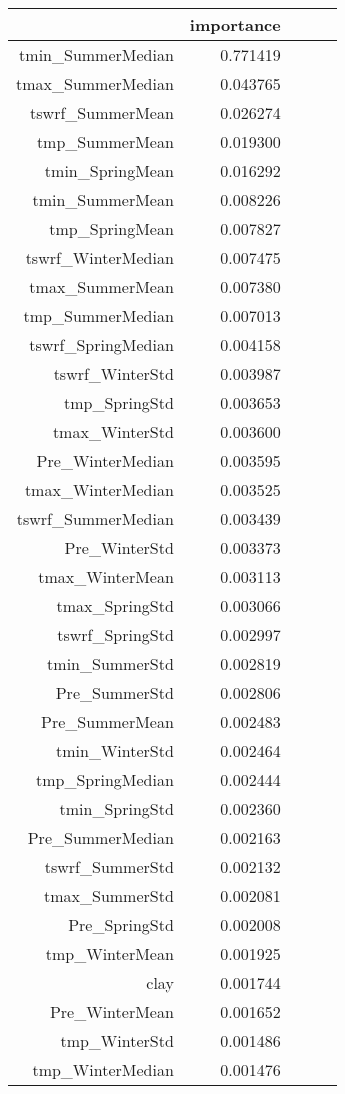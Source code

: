 \begin{tabular}{rrrrr}
\toprule
 & importance \\
\midrule
tmin_SummerMedian & 0.771419 \\
tmax_SummerMedian & 0.043765 \\
tswrf_SummerMean & 0.026274 \\
tmp_SummerMean & 0.019300 \\
tmin_SpringMean & 0.016292 \\
tmin_SummerMean & 0.008226 \\
tmp_SpringMean & 0.007827 \\
tswrf_WinterMedian & 0.007475 \\
tmax_SummerMean & 0.007380 \\
tmp_SummerMedian & 0.007013 \\
tswrf_SpringMedian & 0.004158 \\
tswrf_WinterStd & 0.003987 \\
tmp_SpringStd & 0.003653 \\
tmax_WinterStd & 0.003600 \\
Pre_WinterMedian & 0.003595 \\
tmax_WinterMedian & 0.003525 \\
tswrf_SummerMedian & 0.003439 \\
Pre_WinterStd & 0.003373 \\
tmax_WinterMean & 0.003113 \\
tmax_SpringStd & 0.003066 \\
tswrf_SpringStd & 0.002997 \\
tmin_SummerStd & 0.002819 \\
Pre_SummerStd & 0.002806 \\
Pre_SummerMean & 0.002483 \\
tmin_WinterStd & 0.002464 \\
tmp_SpringMedian & 0.002444 \\
tmin_SpringStd & 0.002360 \\
Pre_SummerMedian & 0.002163 \\
tswrf_SummerStd & 0.002132 \\
tmax_SummerStd & 0.002081 \\
Pre_SpringStd & 0.002008 \\
tmp_WinterMean & 0.001925 \\
clay & 0.001744 \\
Pre_WinterMean & 0.001652 \\
tmp_WinterStd & 0.001486 \\
tmp_WinterMedian & 0.001476 \\

\end{tabular}
